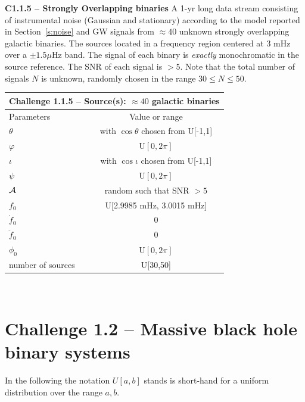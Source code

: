 \documentclass[11pt]{report}
\begin{document}
\begin{description}
\item {\bf C1.1.5 -- Strongly Overlapping binaries} A 1-yr long data stream consisting of instrumental noise (Gaussian and stationary) according to the model reported in Section~\ref{s:noise} and GW signals from $\approx 40$ unknown strongly overlapping galactic binaries. The sources located in a frequency region centered at 3 mHz over a $\pm 1.5 \mu$Hz band. The signal of each binary is {\em exactly} monochromatic in the source reference. The SNR of each signal is $> 5$. Note that the total number of signals $N$ is unknown, randomly chosen in the range $30 \le N \le 50$.

\begin{center}
\begin{tabular}{l|c}
\hline \hline
\multicolumn{2}{c}{{\bf Challenge 1.1.5 -- Source(s): $\approx 40$ galactic binaries}} \\
\hline
Parameters & Value or range \\
\hline
$\theta$          & with $\cos\theta$ chosen from U[-1,1]\\
$\varphi$         & U$[0,2\pi]$ \\ 
$\iota$           & with $\cos\iota$ chosen from U[-1,1]\\ 
$\psi$            & U$[0,2\pi]$ \\
${\cal A}$        & random such that SNR $> 5$  \\
$f_0$             & U[2.9985 mHz, 3.0015 mHz] \\ 
$\dot{f}_0$       & 0 \\ 
$\ddot{f}_0$      & 0\\ 
$\phi_0$          & U$[0,2\pi]$ \\
number of sources & U[30,50] \\
\hline \hline
\end{tabular} \\
\end{center}

\end{description}


\section{Challenge 1.2 -- Massive black hole binary systems}

In the following the notation $U[a,b]$ stands is short-hand for a uniform distribution over the range $a,b$. 
\end{document}
